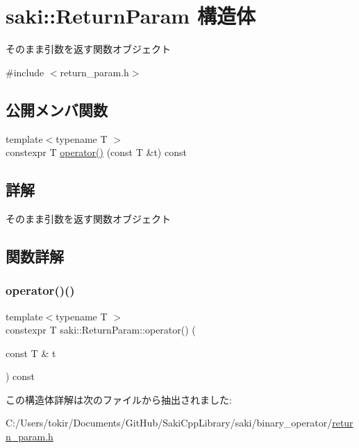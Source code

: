 \hypertarget{structsaki_1_1_return_param}{}\section{saki\+:\+:Return\+Param 構造体}
\label{structsaki_1_1_return_param}


そのまま引数を返す関数オブジェクト  




{\ttfamily \#include $<$return\+\_\+param.\+h$>$}

\subsection*{公開メンバ関数}
\begin{DoxyCompactItemize}
\item 
{\footnotesize template$<$typename T $>$ }\\constexpr T \mbox{\hyperlink{structsaki_1_1_return_param_aac580f81f20f20e1f29cb17992e1520b}{operator()}} (const T \&t) const
\end{DoxyCompactItemize}


\subsection{詳解}
そのまま引数を返す関数オブジェクト 

\subsection{関数詳解}
\mbox{\label{structsaki_1_1_return_param_aac580f81f20f20e1f29cb17992e1520b}} 
\subsubsection{\texorpdfstring{operator()()}{operator()()}}
{\footnotesize\ttfamily template$<$typename T $>$ \\
constexpr T saki\+::\+Return\+Param\+::operator() (\begin{DoxyParamCaption}\item[{const T \&}]{t }\end{DoxyParamCaption}) const\hspace{0.3cm}{\ttfamily [inline]}}



この構造体詳解は次のファイルから抽出されました\+:\begin{DoxyCompactItemize}
\item 
C\+:/\+Users/tokir/\+Documents/\+Git\+Hub/\+Saki\+Cpp\+Library/saki/binary\+\_\+operator/\mbox{\hyperlink{return__param_8h}{return\+\_\+param.\+h}}\end{DoxyCompactItemize}
